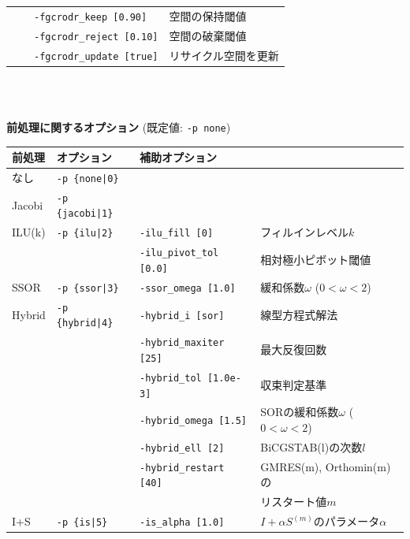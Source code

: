 \documentclass[a4paper]{jarticle}
\begin{document}
{{\begin{minipage}[t]{\textwidth}
\begin{center}
\begin{tabular}{l|lll}
             &                          & \verb=-fgcrodr_keep [0.90]= & 空間の保持閾値 \\
             &                          & \verb=-fgcrodr_reject [0.10]= & 空間の破棄閾値 \\
             &                          & \verb=-fgcrodr_update [true]= & リサイクル空間を更新 \\
\hline         
\end{tabular}
\end{center}
\end{minipage}
\\ \\
\begin{minipage}[t]{\textwidth}
\begin{center}
{\bf 前処理に関するオプション} (既定値: \verb=-p none=) \\
\begin{tabular}{l|lll}\hline\hline
前処理   & オプション           & 補助オプション \\ \hline
なし     & \verb=-p {none|0}=    &   \\
Jacobi   & \verb=-p {jacobi|1}=  &     \\
ILU(k)   & \verb=-p {ilu|2}=     & \verb=-ilu_fill [0]=    & フィルインレベル$k$ \\
         &                       & \verb=-ilu_pivot_tol [0.0]= & 相対極小ピボット閾値 \\
SSOR     & \verb=-p {ssor|3}=    & \verb=-ssor_omega [1.0]=    & 緩和係数$\omega$ ($0<\omega<2$) \\
Hybrid   & \verb=-p {hybrid|4}=  & \verb=-hybrid_i [sor]=  & 線型方程式解法 \\
         &                       & \verb=-hybrid_maxiter [25]= & 最大反復回数 \\
         &                       & \verb=-hybrid_tol [1.0e-3]= & 収束判定基準 \\
         &                       & \verb=-hybrid_omega [1.5]=  & SORの緩和係数$\omega$ ($0<\omega<2$) \\
         &                       & \verb=-hybrid_ell [2]=      & BiCGSTAB(l)の次数$l$\\
         &                       & \verb=-hybrid_restart [40]= & GMRES(m), Orthomin(m)の \\
         &                       &                             & リスタート値$m$ \\
I+S      & \verb=-p {is|5}=      & \verb=-is_alpha [1.0]=  & $I+\alpha S^{(m)}$のパラメータ$\alpha$ \\

\end{tabular}
\end{center}
\end{minipage}}}
\end{document}

